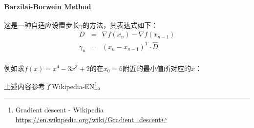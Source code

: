 \paragraph{Barzilai-Borwein Method}
这是一种自适应设置步长$\gamma$的方法，其表达式如下：
\begin{eqnarray*}
	D&=&\nabla f(x_n)-\nabla f(x_{n-1})\\
	\gamma_n&=&(x_n-x_{n-1})^T\cdot \hat{D}\\
\end{eqnarray*}

例如求$f(x)=x^4-3x^3+2$的在$x_0=6$附近的最小值所对应的$x$：



上述内容参考了Wikipedia-EN\footnote{
	Gradient descent - Wikipedia
	\url{https://en.wikipedia.org/wiki/Gradient\_descent}
}。
